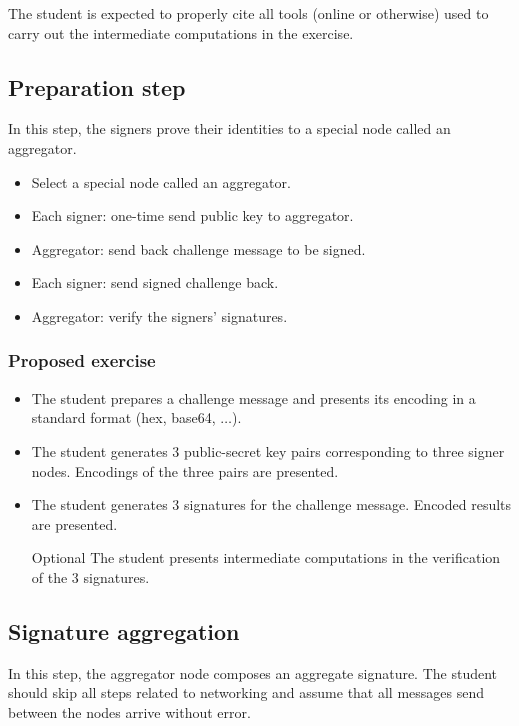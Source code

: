 \documentclass{article}
\begin{document}
The student is expected to properly cite all tools (online or otherwise) used to carry out the intermediate computations in the exercise.


\subsection{Preparation step} 
In this step, the signers prove their identities to a special node called an aggregator.
\begin{itemize}
\item Select a special node called an aggregator.
\item Each signer: one-time send public key to aggregator.
\item Aggregator: send back challenge message to be signed.
\item Each signer: send signed challenge back.
\item Aggregator: verify the signers' signatures. 
\end{itemize}

\subsubsection{Proposed exercise}
\begin{itemize}
\item The student prepares a challenge message and presents its encoding in a standard format (hex, base64, $\dots$).
\item The student generates $3$ public-secret key pairs corresponding to three signer nodes. Encodings  of the three pairs are presented.
\item The student generates $3$ signatures for the challenge message. Encoded results are presented.
\item[Optional] The student presents intermediate computations in the verification of the $3$ signatures.
\end{itemize}

\subsection{Signature aggregation}
In this step, the aggregator node composes an aggregate signature. The student should skip all steps related to networking and assume that all messages send between the nodes arrive without error. 
\end{document}
